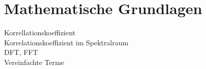 ﻿\section{Mathematische Grundlagen}
Korrellationskoeffizient\\
Korrelationskoeffizient im Spektralraum\\
DFT, FFT\\
Vereinfachte Terme